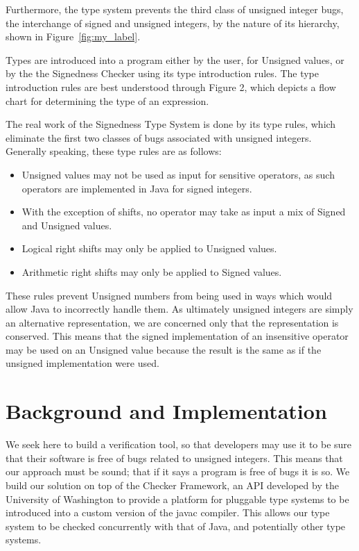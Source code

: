 \documentclass{sig-alternate-05-2015}
\begin{document}
Furthermore, the type system prevents the third class of unsigned integer bugs, the interchange of signed and unsigned integers, by the nature of its hierarchy, shown in Figure~\ref{fig:my_label}.

Types are introduced into a program either by the user, for Unsigned values, or by the the Signedness Checker using its type introduction rules. The type introduction rules are best understood through Figure 2, which depicts a flow chart for determining the type of an expression.


The real work of the Signedness Type System is done by its type rules, which eliminate the first two classes of bugs associated with unsigned integers. Generally speaking, these type rules are as follows:

\begin{itemize}
  \item Unsigned values may not be used as input for sensitive operators, as such operators are implemented in Java for signed integers.
  \item With the exception of shifts, no operator may take as input a mix of Signed and Unsigned values.
  \item Logical right shifts may only be applied to Unsigned values.
  \item Arithmetic right shifts may only be applied to Signed values.
\end{itemize}

These rules prevent Unsigned numbers from being used in ways which would allow Java to incorrectly handle them. As ultimately unsigned integers are simply an alternative representation, we are concerned only that the representation is conserved. This means that the signed implementation of an insensitive operator may be used on an Unsigned value because the result is the same as if the unsigned implementation were used.

\section{Background and Implementation}


We seek here to build a verification tool, so that developers may use it to be sure that their software is free of bugs related to unsigned integers. This means that our approach must be sound; that if it says a program is free of bugs it is so. We build our solution on top of the Checker Framework, an API developed by the University of Washington to provide a platform for pluggable type systems to be introduced into a custom version of the javac compiler. This allows our type system to be checked concurrently with that of Java, and potentially other type systems.
\end{document}
